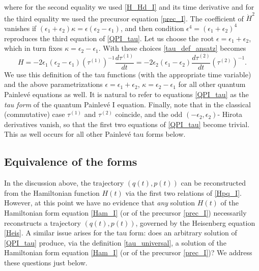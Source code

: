 \documentclass[12pt,a4paper]{article}
\numberwithin{equation}{section}
\begin{document}
where for the second equality we
used \eqref{H_Hd_I} and its time derivative and for the third equality we used the precursor equation \eqref{prec_I}. The coefficient of $\dot{H}^2$ vanishes if $(\epsilon_1{+}\epsilon_2)\kappa=\epsilon(\epsilon_2{-}\epsilon_1)$, and then condition $\epsilon^4=(\epsilon_1{+}\epsilon_2)^4$ reproduces the third equation of \eqref{QPI_tau}.
Let us choose the root $\epsilon=\epsilon_1{+}\epsilon_2$, which in turn fixes $\kappa=\epsilon_2{-}\epsilon_1$. With these choices \eqref{tau_def_ansatz} becomes
\begin{equation}\label{tau_universal}
H=-2\epsilon_1(\epsilon_2{-}\epsilon_1)\left(\tau^{(1)}\right)^{-1}\frac{d\tau^{(1)}}{dt}=-2\epsilon_2(\epsilon_1{-}\epsilon_2)\frac{d\tau^{(2)}}{dt}\left(\tau^{(2)}\right)^{-1}.
\end{equation}    
We use this definition of the tau functions (with the appropriate time variable) and the above parametrizations $\epsilon=\epsilon_1{+}\epsilon_2$, $\kappa=\epsilon_2{-}\epsilon_1$ for all other quantum Painlev\'e equations as well. It is natural to refer to equations \eqref{QPI_tau} as the \textit{tau form} of the quantum Painlev\'e I equation. Finally, note that in the classical (commutative) case $\tau^{(1)}$ and $\tau^{(2)}$ coincide, and the odd $(-\epsilon_2,\epsilon_2)$- Hirota derivatives vanish, so that the first two equations of \eqref{QPI_tau} become trivial. This as well occurs for all other Painlev\'e tau forms below.


\subsection{Equivalence of the forms}
\label{ssec:equivalence_I}
In the discussion above, the trajectory $(q(t),p(t))$ can be reconstructed from the Hamiltonian function $H(t)$ via the first two relations of \eqref{Hpq_I}. However, at this point we have no evidence that \textit{any} solution $H(t)$ of the Hamiltonian form equation \eqref{Ham_I} (or of the precursor \eqref{prec_I}) necessarily reconstructs a trajectory $(q(t),p(t))$, governed by the Heisenberg equation \eqref{Heis}. A similar issue arises for the tau form: does an arbitrary solution of \eqref{QPI_tau} produce, via the definition \eqref{tau_universal}, a solution of the Hamiltonian form equation \eqref{Ham_I} (or of the precursor \eqref{prec_I})? We address these questions just below.
\end{document}
